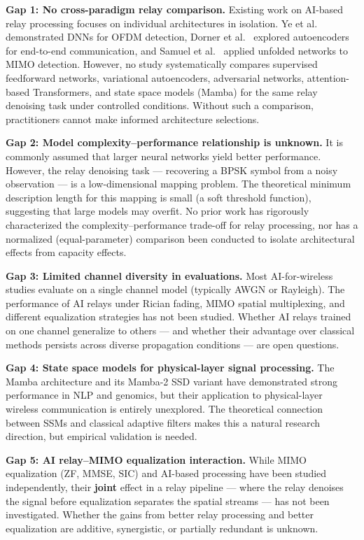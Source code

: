 \textbf{Gap 1: No cross-paradigm relay comparison.} Existing work on AI-based relay processing focuses on individual architectures in isolation. Ye et al.~\cite{ye2018power} demonstrated DNNs for OFDM detection, Dorner et al.~\cite{dorner2018deep} explored autoencoders for end-to-end communication, and Samuel et al.~\cite{samuel2019learning} applied unfolded networks to MIMO detection. However, no study systematically compares supervised feedforward networks, variational autoencoders, adversarial networks, attention-based Transformers, and state space models (Mamba) for the same relay denoising task under controlled conditions. Without such a comparison, practitioners cannot make informed architecture selections.

\textbf{Gap 2: Model complexity--performance relationship is unknown.} It is commonly assumed that larger neural networks yield better performance. However, the relay denoising task --- recovering a BPSK symbol from a noisy observation --- is a low-dimensional mapping problem. The theoretical minimum description length for this mapping is small (a soft threshold function), suggesting that large models may overfit. No prior work has rigorously characterized the complexity--performance trade-off for relay processing, nor has a normalized (equal-parameter) comparison been conducted to isolate architectural effects from capacity effects.

\textbf{Gap 3: Limited channel diversity in evaluations.} Most AI-for-wireless studies evaluate on a single channel model (typically AWGN or Rayleigh). The performance of AI relays under Rician fading, MIMO spatial multiplexing, and different equalization strategies has not been studied. Whether AI relays trained on one channel generalize to others --- and whether their advantage over classical methods persists across diverse propagation conditions --- are open questions.

\textbf{Gap 4: State space models for physical-layer signal processing.} The Mamba architecture \cite{gu2024mamba} and its Mamba-2 SSD variant \cite{dao2024transformers} have demonstrated strong performance in NLP and genomics, but their application to physical-layer wireless communication is entirely unexplored. The theoretical connection between SSMs and classical adaptive filters makes this a natural research direction, but empirical validation is needed.

\textbf{Gap 5: AI relay--MIMO equalization interaction.} While MIMO equalization (ZF, MMSE, SIC) and AI-based processing have been studied independently, their \textbf{joint} effect in a relay pipeline --- where the relay denoises the signal before equalization separates the spatial streams --- has not been investigated. Whether the gains from better relay processing and better equalization are additive, synergistic, or partially redundant is unknown.

